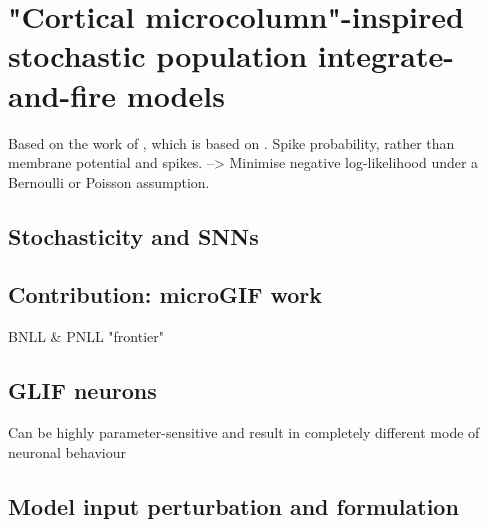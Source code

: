 \documentclass[mphil,deptreport,ai]{infthesis} %
\begin{document}
\section{"Cortical microcolumn"-inspired stochastic population integrate-and-fire models}

Based on the work of \cite{Rene2020}, which is based on \cite{Schwalger2017}.
Spike probability, rather than membrane potential and spikes.
--> Minimise negative log-likelihood under a Bernoulli or Poisson assumption.


\subsection{Stochasticity and SNNs}

\subsection{Contribution: microGIF work}

BNLL \& PNLL "frontier"

\subsection{GLIF neurons}

Can be highly parameter-sensitive and result in completely different mode of neuronal behaviour




\subsection{Model input perturbation and formulation}
\end{document}
